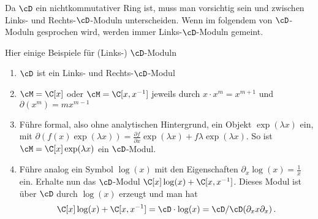 Da $\cD$ ein nichtkommutativer Ring ist, muss man vorsichtig sein und zwischen
Links- und Rechts-$\cD$-Moduln unterscheiden.
Wenn im folgendem von $\cD$-Moduln gesprochen wird, werden immer
Links-$\cD$-Moduln gemeint.

\begin{exmp}
Hier einige Beispiele für (Links-) $\cD$-Moduln
\begin{enumerate}
%
\item $\cD$ ist ein Links- und Rechts-$\cD$-Modul
%
\item $\cM=\C[x]$ oder $\cM=\C[x,x^{-1}]$ jeweils durch $x\cdot x^{m}=x^{m+1}$
und $\partial(x^m)=mx^{m-1}$
%
\item Führe formal, also ohne analytischen Hintergrund, ein Objekt
$\exp(\lambda x)$ ein, mit $\partial(f(x)\exp(\lambda x))=\frac{\partial
f}{\partial x}\exp(\lambda x)+f\lambda\exp(\lambda x)$.  So ist
$\cM=\C[x]\exp(\lambda x)$ ein $\cD$-Modul.
%
\begin{comment}
\cite[Exmp 2.2]{ArkhipovDmod}
\end{comment}
\item Führe analog ein Symbol $\log(x)$ mit den Eigenschaften
$\partial_x\log(x)=\frac{1}{x}$ ein. Erhalte nun das $\cD$-Modul
$\C[x]\log(x)+\C[x,x^{-1}]$. Dieses Modul ist über $\cD$ durch $\log(x)$
erzeugt und man hat
\[
\C[x]\log(x)+\C[x,x^{-1}]=\cD\cdot\log(x)=\cD\slash\cD(\partial_x x\partial_x) \,.
\]
\begin{comment}
TODO: prüfen
\end{comment}
\begin{comment}
\cite[Exmp 3.1.4]{ginzburg}
\end{comment}
\end{enumerate}
\end{exmp}

\begin{comment}
\begin{lem}\cite[Lem 2.3.3.]{sabbah_cimpa90}
Sei $\cM$ ein Links-$\cD$-Modul von endlichem Typ, welches auch von endlichem
Typ über $\Ckx$ ist. Dann ist $\cM$ bereits ein freies $\C\{x\}$-Modul.
\end{lem}
\begin{proof}
Siehe \cite[Lem 2.3.3.]{sabbah_cimpa90}.
\end{proof}
\begin{cor} \cite[Cor 2.3.4.]{sabbah_cimpa90}
Falls $\cM$ ein Links-$\cD$-Modul von endlichem Typ, welches außerdem ein
endlich dimensionaler Vektorraum ist, so ist schon $\cM=\{0\}$.
\end{cor}
\end{comment}

